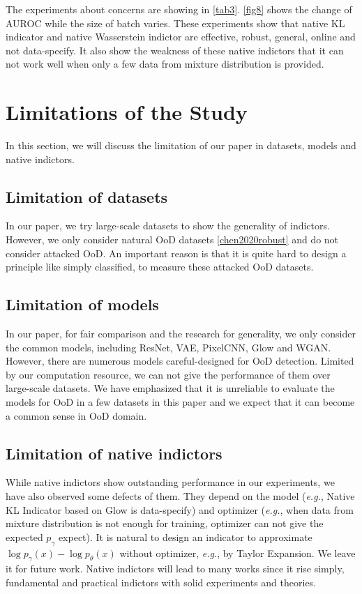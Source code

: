 \documentclass[letterpaper]{article} %
\newcommand{\EG}{\textit{e.g.}, }
\begin{document}
The experiments about concerns are showing in \cref{tab3}. \cref{fig8} shows the change of AUROC while the size of batch varies. These experiments show that native KL indicator and native Wasserstein indictor are effective, robust, general, online and not data-specify. It also show the weakness of these native indictors that it can not work well when only a few data from mixture distribution is provided. 

\section{Limitations of the Study} In this section, we will discuss the limitation of our paper in datasets, models and native indictors. 

\subsection{Limitation of datasets}
In our paper, we try large-scale datasets to show the generality of indictors. However, we only consider natural OoD datasets \cref{chen2020robust} and do not consider attacked OoD. An important reason is that it is quite hard to design a principle like simply classified, to measure these attacked OoD datasets. 

\subsection{Limitation of models} 
In our paper, for fair comparison and the research for generality, we only consider the common models, including ResNet, VAE, PixelCNN, Glow and WGAN. However, there are numerous models careful-designed for OoD detection. Limited by our computation resource, we can not give the performance of them over large-scale datasets. 
We have emphasized that it is unreliable to evaluate the models for OoD in a few datasets in this paper and we expect that it can become a common sense in OoD domain. 

\subsection{Limitation of native indictors} 
While native indictors show outstanding performance in our experiments, we have also observed some defects of them. They depend on the model (\EG Native KL Indicator based on Glow is data-specify) and optimizer (\EG when data from mixture distribution is not enough for training, optimizer can not give the expected $p_\gamma$ expect). It is natural to design an indicator to approximate $\log p_\gamma(x) - \log p_\theta(x)$ without optimizer, \EG by Taylor Expansion. We leave it for future work. 
Native indictors will lead to many works since it rise simply, fundamental and practical indictors with solid experiments and theories. 
\end{document}
